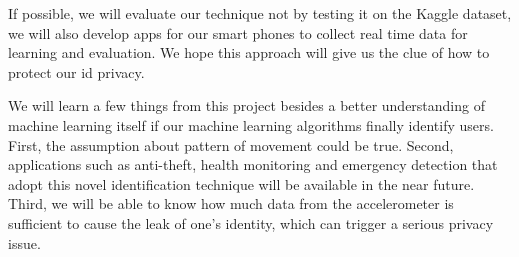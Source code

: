 \documentclass{article} %
\begin{document}
If possible, we will evaluate our technique not by testing it on the Kaggle dataset, we will also develop apps for our smart phones to collect real time data for learning and evaluation. We hope this approach will give us the clue of how to protect our id privacy.

We will learn a few things from this project besides a better understanding of machine learning itself if our machine learning algorithms finally identify users. First, the assumption about pattern of movement could be true. Second, applications such as anti-theft, health monitoring and emergency detection that adopt this novel identification technique will be available in the near future. Third, we will be able to know how much data from the accelerometer is sufficient to cause the leak of one's identity, which can trigger a serious privacy issue.






\end{document}
